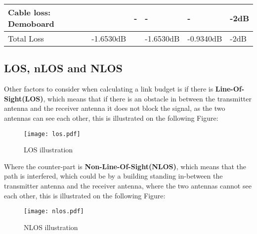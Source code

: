 \begin{table}[H]
\begin{tabular}{|l|l|l|l|l|l|}
Cable loss: Demoboard                                                       &                                                          & -                                                       & -                                                        & -                                                       & -2dB                                                          \\ \hline
Total Loss                                                                  & -1.6530dB                                                &                                                         & -1.6530dB                                                 & -0.9340dB                                              & -2dB                                                          \\ \hline
\end{tabular}
\end{table}



\subsection{LOS, nLOS and NLOS}

Other factors to consider when calculating a link budget is if there is \textbf{Line-Of-Sight(LOS)}, which means that if there is an obstacle in between the transmitter antenna and the receiver antenna it does not block the signal, as the two antennas can see each other, this is illustrated on the following Figure:

\begin{figure}[H]
\centering
\texttt{[image: los.pdf]}
\caption{LOS illustration}
\label{LOS}
\end{figure}  


Where the counter-part is \textbf{Non-Line-Of-Sight(NLOS)}, which means that the path is interfered, which could be by a building standing in-between the transmitter antenna and the receiver antenna, where the two antennas cannot see each other, this is illustrated on the following Figure: 

\begin{figure}[H]
\centering
\texttt{[image: nlos.pdf]}
\caption{NLOS illustration}
\label{dijdkkfkfddd}
\end{figure} 

